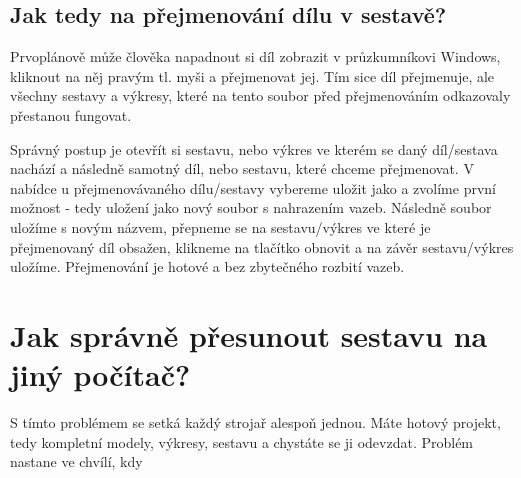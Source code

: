 \subsection*{Jak tedy na přejmenování dílu v sestavě?}
Prvoplánově může člověka napadnout si díl zobrazit v průzkumníkovi Windows, kliknout na něj pravým tl. myši a přejmenovat jej. 
Tím sice díl přejmenuje, ale všechny sestavy a výkresy, které na tento soubor před přejmenováním odkazovaly přestanou fungovat.

Správný postup je otevřít si sestavu, nebo výkres ve kterém se daný díl/sestava nachází a následně samotný díl, nebo sestavu, které chceme přejmenovat.
V nabídce  u přejmenovávaného dílu/sestavy vybereme uložit jako a zvolíme první možnost - tedy uložení jako nový soubor s nahrazením vazeb.
Následně soubor uložíme s novým názvem, přepneme se na sestavu/výkres ve které je přejmenovaný díl obsažen, klikneme na tlačítko obnovit a na závěr sestavu/výkres uložíme.
Přejmenování je hotové a bez zbytečného rozbití vazeb.

\section{Jak správně přesunout sestavu na jiný počítač?}
S tímto problémem se setká každý strojař alespoň jednou.
Máte hotový projekt, tedy kompletní modely, výkresy, sestavu a chystáte se ji odevzdat.
Problém nastane ve chvílí, kdy 

\newpage
